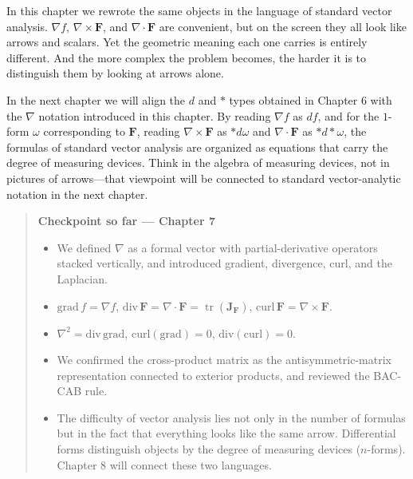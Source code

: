 \documentclass[a4paper,12pt,openany]{book}
\begin{document}
In this chapter we rewrote the same objects in the language of standard
vector analysis. \(\nabla f\), \(\nabla\times\mathbf F\), and
\(\nabla\cdot\mathbf F\) are convenient, but on the screen they all look
like arrows and scalars. Yet the geometric meaning each one carries is
entirely different. And the more complex the problem becomes, the harder
it is to distinguish them by looking at arrows alone.

In the next chapter we will align the \(d\) and \(\ast\) types obtained
in Chapter 6 with the \(\nabla\) notation introduced in this chapter. By
reading \(\nabla f\) as \(df\), and for the \(1\)-form \(\omega\)
corresponding to \(\mathbf F\), reading \(\nabla\times\mathbf F\) as
\(\ast d\omega\) and \(\nabla\cdot\mathbf F\) as \(\ast d\ast\omega\),
the formulas of standard vector analysis are organized as equations that
carry the degree of measuring devices. Think in the algebra of measuring
devices, not in pictures of arrows—that viewpoint will be connected to
standard vector-analytic notation in the next chapter.

\begin{quote}
\textbf{Checkpoint so far — Chapter 7}

\begin{itemize}
\item
  We defined \(\nabla\) as a formal vector with partial-derivative
  operators stacked vertically, and introduced gradient, divergence,
  curl, and the Laplacian.
\item
  \(\mathrm{grad}\,f = \nabla f\),
  \(\mathrm{div}\,\mathbf{F} = \nabla \cdot \mathbf{F} = \operatorname{tr}(\mathbf{J}_\mathbf{F})\),
  \(\mathrm{curl}\,\mathbf{F} = \nabla \times \mathbf{F}\).
\item
  \(\nabla^2 = \mathrm{div}\,\mathrm{grad}\),
  \(\mathrm{curl}(\mathrm{grad}) = 0\),
  \(\mathrm{div}(\mathrm{curl}) = 0\).
\item
  We confirmed the cross-product matrix as the antisymmetric-matrix
  representation connected to exterior products, and reviewed the
  BAC-CAB rule.
\item
  The difficulty of vector analysis lies not only in the number of
  formulas but in the fact that everything looks like the same arrow.
  Differential forms distinguish objects by the degree of measuring
  devices (\(n\)-forms). Chapter 8 will connect these two languages.
\end{itemize}
\end{quote}

\newpage
\end{document}
